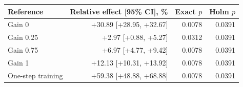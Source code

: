 \begin{tabular}{lrrr}
\toprule
Reference & Relative effect [95\% CI], \% & Exact $p$ & Holm $p$ \\
\midrule
Gain 0 & +30.89 [+28.95, +32.67] & 0.0078 & 0.0391 \\
Gain 0.25 & +2.97 [+0.88, +5.27] & 0.0312 & 0.0391 \\
Gain 0.75 & +6.97 [+4.77, +9.42] & 0.0078 & 0.0391 \\
Gain 1 & +12.13 [+10.31, +13.92] & 0.0078 & 0.0391 \\
One-step training & +59.38 [+48.88, +68.88] & 0.0078 & 0.0391 \\
\bottomrule
\end{tabular}
